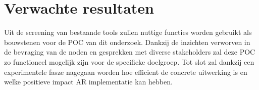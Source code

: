 \documentclass{hogent-article}
\begin{document}
    \section{Verwachte resultaten}%
    \label{sec:verwachte-resultaten}
    
    
    Uit de screening van bestaande tools zullen nuttige functies worden gebruikt als bouwstenen voor de POC van dit onderzoek. Dankzij de inzichten verworven in de bevraging van de noden en gesprekken met diverse stakeholders zal deze POC zo functioneel mogelijk zijn voor de specifieke doelgroep. Tot slot zal dankzij een experimentele fasze nagegaan worden hoe efficient de concrete uitwerking is en welke positieve impact AR implementatie kan hebben.
    
    
\end{document}
